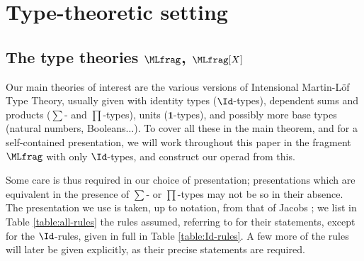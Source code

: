 \section{Type-theoretic setting}\label{sec:type-theory-background}

\subsection{The type theories \texorpdfstring{$\MLfrag$}{ML\_Id}, \texorpdfstring{$\MLfrag[X]$}{ML\_Id[X]}}

\noindent Our main theories of interest are the various versions of Intensional Martin-L\"of Type Theory, usually given with identity types ($\Id$-types), dependent sums and products ($\sum$- and $\prod$-types), units ($\mathbf{1}$-types), and possibly more base types (natural numbers, Booleans$\ldots$).  To cover all these in the main theorem, and for a self-contained presentation, we will work throughout this paper in the fragment $\MLfrag$ with only $\Id$-types, and construct our operad from this.

Some care is thus required in our choice of presentation; presentations which are equivalent in the presence of $\sum$- or $\prod$-types may not be so in their absence.  The presentation we use is taken, up to notation, from that of Jacobs \cite{jacobs:categorical-logic}; we list in Table \ref{table:all-rules} the rules assumed, referring to \cite{jacobs:categorical-logic} for their statements, except for the $\Id$-rules, given in full in Table \ref{table:Id-rules}.  A few more of the rules will later be given explicitly, as their precise statements are required.

